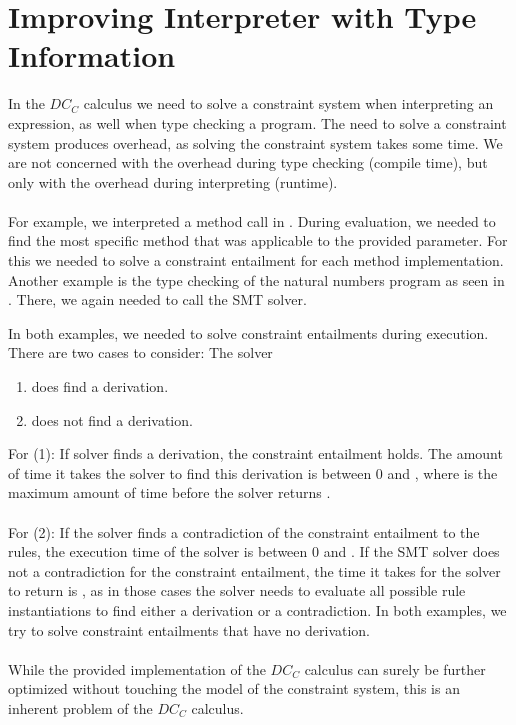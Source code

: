 \chapter{Improving Interpreter with Type Information}
In the $DC_C$ calculus we need to solve a constraint system
when interpreting an expression, as well when type checking a program.
The need to solve a constraint system produces overhead,
as solving the constraint system takes some time.
We are not concerned with the overhead during type checking (compile time),
but only with the overhead during interpreting (runtime).\\
\\
For example, we interpreted a method call in .
During evaluation, we needed to find the most specific method
that was applicable to the provided parameter.
For this we needed to solve a constraint entailment
for each method implementation.
Another example is the type checking of the natural numbers program
as seen in .
There, we again needed to call the SMT solver.

In both examples, we needed to solve constraint entailments during execution.
There are two cases to consider: The solver
\begin{enumerate}
  \item does find a derivation.
  \item does not find a derivation.
\end{enumerate}
For (1):
If solver finds a derivation,
the constraint entailment holds.
The amount of time it takes the solver to find this derivation
is between $0$ and ,
where  is the maximum amount of time before the solver returns .\\
\\
For (2):
If the solver finds a contradiction of the constraint entailment to the rules,
the execution time of the solver is between $0$ and .
If the SMT solver does not a contradiction for the constraint entailment,
the time it takes for the solver to return is ,
as in those cases the solver needs to evaluate all possible rule instantiations
to find either a derivation or a contradiction.
In both examples, we try to solve constraint entailments that have no derivation.\\
\\
While the provided implementation of the $DC_C$ calculus
can surely be further optimized without
touching the model of the constraint system,
this is an inherent problem of the $DC_C$ calculus.

